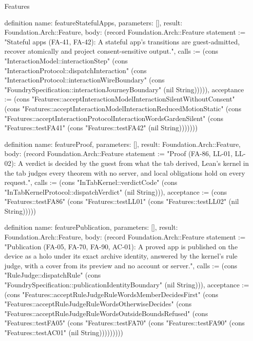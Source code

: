 \begin{lexlean}{Features}
\begin{semanticmodule}
definition{
  name: featureStatefulApps,
  parameters: [],
  result: Foundation.Arch::Feature,
  body: (record Foundation.Arch::Feature {statement := "Stateful apps (FA-41, FA-42): A stateful app's transitions are guest-admitted, recover atomically and project consent-sensitive output.", calls := (cons "InteractionModel::interactionStep" (cons "InteractionProtocol::dispatchInteraction" (cons "InteractionProtocol::interactionWireBoundary" (cons "FoundrySpecification::interactionJourneyBoundary" (nil String))))), acceptance := (cons "Features::acceptInteractionModelInteractionSilentWithoutConsent" (cons "Features::acceptInteractionModelInteractionReducedMotionStatic" (cons "Features::acceptInteractionProtocolInteractionWordsGardenSilent" (cons "Features::testFA41" (cons "Features::testFA42" (nil String))))))})
}

definition{
  name: featureProof,
  parameters: [],
  result: Foundation.Arch::Feature,
  body: (record Foundation.Arch::Feature {statement := "Proof (FA-86, LL-01, LL-02): A verdict is decided by the guest from what the tab derived, Lean's kernel in the tab judges every theorem with no server, and local obligations hold on every request.", calls := (cons "InTabKernel::verdictCode" (cons "InTabKernelProtocol::dispatchVerdict" (nil String))), acceptance := (cons "Features::testFA86" (cons "Features::testLL01" (cons "Features::testLL02" (nil String))))})
}

definition{
  name: featurePublication,
  parameters: [],
  result: Foundation.Arch::Feature,
  body: (record Foundation.Arch::Feature {statement := "Publication (FA-05, FA-70, FA-90, AC-01): A proved app is published on the device as a holo under its exact archive identity, answered by the kernel's rule judge, with a cover from its preview and no account or server.", calls := (cons "RuleJudge::dispatchRule" (cons "FoundrySpecification::publicationIdentityBoundary" (nil String))), acceptance := (cons "Features::acceptRuleJudgeRuleWordsMemberDecidesFirst" (cons "Features::acceptRuleJudgeRuleWordsOtherwiseDecides" (cons "Features::acceptRuleJudgeRuleWordsOutsideBoundsRefused" (cons "Features::testFA05" (cons "Features::testFA70" (cons "Features::testFA90" (cons "Features::testAC01" (nil String))))))))})
}


\end{semanticmodule}
\end{lexlean}
